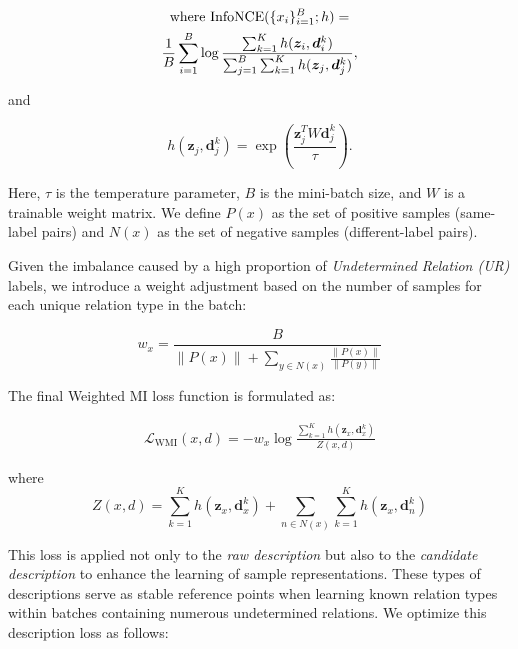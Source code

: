 \begin{multline}
\textnormal{where InfoNCE} (\{ x_i\}_{i=1}^B; h) = \\
\frac{1}{B} \sum_{i=1}^B \log \frac{\sum_{k=1}^K h(\bm{z}_i, \bm{d}_i^k)}{\sum_{j=1}^B \sum_{k=1}^K h(\bm{z}_j, \bm{d}_j^k)},
\end{multline}

and

\begin{equation}
h(\bm{z}_j, \bm{d}_j^k) = \exp \left(\frac{\bm{z}_j^T W \bm{d}_j^k}{\tau} \right).
\end{equation}

Here, $\tau$ is the temperature parameter, $B$ is the mini-batch size, and $W$ is a trainable weight matrix. We define $P(x)$ as the set of positive samples (same-label pairs) and $N(x)$ as the set of negative samples (different-label pairs). 

Given the imbalance caused by a high proportion of \textit{Undetermined Relation (UR)} labels, we introduce a weight adjustment based on the number of samples for each unique relation type in the batch:

\begin{equation}
    w_{x} = \frac{B}{\|P(x)\| + \sum_{y \in N(x)} \frac{\|P(x)\|}{\|P(y)\|}}
\end{equation}

The final Weighted MI loss function is formulated as:

\begin{multline}
\mathcal{L}_{\textrm{WMI}}(x, d) = 
- w_{x}\log \frac{ \sum_{k=1}^K
    h(\bm{z}_x, \bm{d}_x^k)
}{Z(x,d)}
\end{multline}

\noindent where
\begin{equation}
Z(x,d) = \sum_{k=1}^K h(\bm{z}_x, \bm{d}_x^k) + \sum_{n \in N(x)} \sum_{k=1}^K h(\bm{z}_x, \bm{d}_n^k)
\end{equation}

This loss is applied not only to the \textit{raw description} but also to the \textit{candidate description} to enhance the learning of sample representations. These types of descriptions serve as stable reference points when learning known relation types within batches containing numerous undetermined relations. We optimize this description loss as follows:

